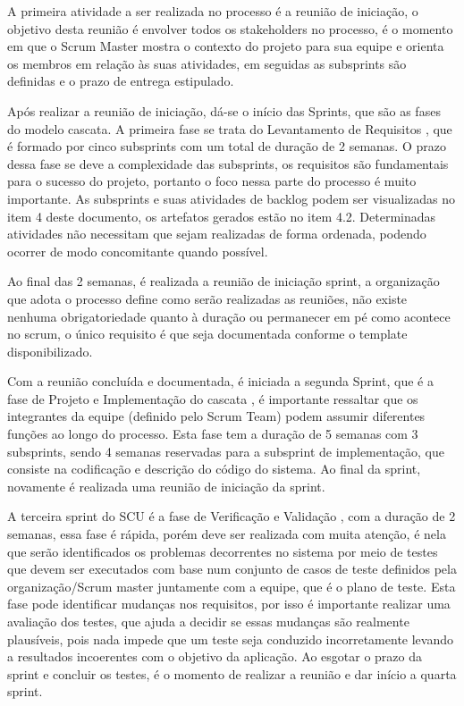 \documentclass[	DIV=calc,%
							paper=a4,%
							fontsize=12pt,%
							onecolumn]{scrartcl}%
\begin{document}
A primeira atividade a ser realizada no processo é a reunião de iniciação, o objetivo desta reunião é envolver todos os stakeholders no processo, é o momento em que o Scrum Master mostra o contexto do projeto para sua equipe e orienta os membros em relação às suas atividades, em seguidas as subsprints são definidas e o prazo de entrega estipulado.

Após realizar a reunião de iniciação, dá-se o início das Sprints, que são as fases do modelo cascata. A primeira fase se trata do Levantamento de Requisitos \cite{sommervilleengenharia}, que é formado por cinco subsprints com um total de duração de 2 semanas. O prazo dessa fase se deve a complexidade das subsprints, os requisitos são fundamentais para o sucesso do projeto, portanto o foco nessa parte do processo é muito importante. As subsprints e suas atividades de backlog podem ser visualizadas no item 4 deste documento, os artefatos gerados estão no item 4.2. Determinadas atividades não necessitam que sejam realizadas de forma ordenada, podendo ocorrer de modo concomitante quando possível.

Ao final das 2 semanas, é realizada a reunião de iniciação sprint, a organização que adota o processo define como serão realizadas as reuniões, não existe nenhuma obrigatoriedade quanto à duração ou permanecer em pé como acontece no scrum, o único requisito é que seja documentada conforme o template disponibilizado.

Com a reunião concluída e documentada, é iniciada a segunda Sprint, que é a fase de Projeto e Implementação do cascata \cite{sommervilleengenharia}, é importante ressaltar que os integrantes da equipe (definido pelo Scrum Team) podem assumir diferentes funções ao longo do processo. Esta fase tem a duração de 5 semanas com 3 subsprints, sendo 4 semanas reservadas para a subsprint de implementação, que consiste na codificação e descrição do código do sistema. Ao final da sprint, novamente é realizada uma reunião de iniciação da sprint.

A terceira sprint do SCU é a fase de Verificação e Validação , com a duração de 2 semanas, essa fase é rápida, porém deve ser realizada com muita atenção, é nela que serão identificados os problemas decorrentes no sistema por meio de testes que devem ser executados com base num conjunto de casos de teste definidos pela organização/Scrum master juntamente com a equipe, que é o plano de teste. Esta fase pode identificar mudanças nos requisitos, por isso é importante realizar uma avaliação dos testes, que ajuda a decidir se essas mudanças são realmente plausíveis, pois nada impede que um teste seja conduzido incorretamente levando a resultados incoerentes com o objetivo da aplicação. Ao esgotar o prazo da sprint e concluir os testes, é o momento de realizar a reunião e dar início a quarta sprint.
\end{document}
